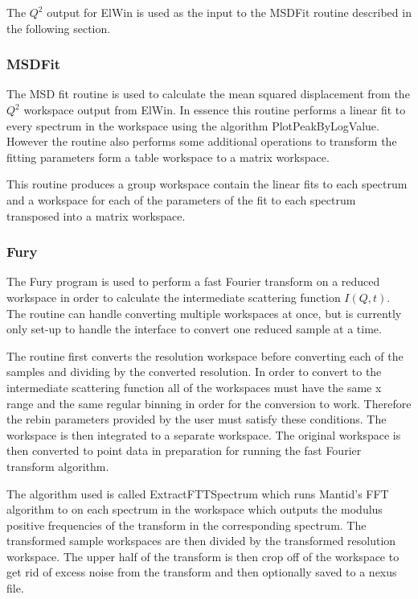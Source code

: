 \documentclass[paper=a4, fontsize=11pt]{scrartcl}	%
\numberwithin{equation}{section}															%
\numberwithin{figure}{section}																%
\numberwithin{table}{section}																%
\begin{document}
The $Q^2$ output for ElWin is used as the input to the MSDFit routine described in the following section.

\subsubsection{MSDFit}
The MSD fit routine is used to calculate the mean squared displacement from the $Q^2$ workspace output from ElWin. In essence this routine performs a linear fit to every spectrum in the workspace using the algorithm PlotPeakByLogValue. However the routine also performs some additional operations to transform the fitting parameters form a table workspace to a matrix workspace.

This routine produces a group workspace contain the linear fits to each spectrum and a workspace for each of the parameters of the fit to each spectrum transposed into a matrix workspace.

\subsubsection{Fury}
The Fury program is used to perform a fast Fourier transform on a reduced workspace in order to calculate the intermediate scattering function $I(Q,t)$. The routine can handle converting multiple workspaces at once, but is currently only set-up to handle the interface to convert one reduced sample at a time.

The routine first converts the resolution workspace before converting each of the samples and dividing by the converted resolution. In order to convert to the intermediate scattering function all of the workspaces must have the same x range and the same regular binning in order for the conversion to work. Therefore the rebin parameters provided by the user must satisfy these conditions. The workspace is then integrated to a separate workspace. The original workspace is then converted to point data in preparation for running the fast Fourier transform algorithm.

The algorithm used is called ExtractFTTSpectrum which runs Mantid's FFT algorithm to on each spectrum in the workspace which outputs the modulus positive frequencies of the transform in the corresponding spectrum. The transformed sample workspaces are then divided by the transformed resolution workspace. The upper half of the transform is then crop off of the workspace to get rid of excess noise from the transform and then optionally saved to a nexus file.
\end{document}

